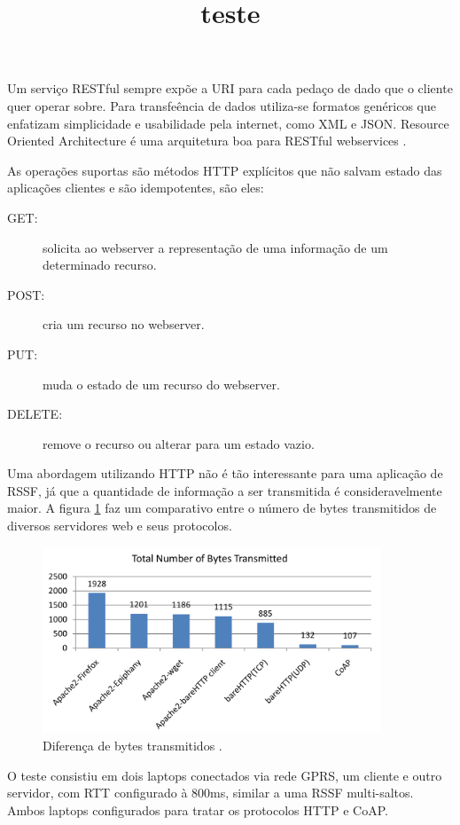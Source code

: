Um servi\c{c}o RESTful sempre exp\~oe a URI para cada peda\c{c}o de dado que o cliente quer operar sobre. Para transfe\^encia de dados utiliza-se formatos gen\'ericos que enfatizam simplicidade e usabilidade pela internet, como XML e JSON. Resource Oriented Architecture \'e uma arquitetura boa para RESTful webservices \cite{richardson2008restful}.

As opera\c{c}\~oes suportas s\~ao m\'etodos HTTP expl\'icitos que n\~ao salvam estado das aplica\c{c}\~oes clientes e s\~ao idempotentes, s\~ao eles:
\begin{description}
    \item[GET:] solicita ao webserver a representa\c{c}\~ao de uma informa\c{c}\~ao de um determinado recurso.
    \item[POST:] cria um recurso no webserver.
    \item[PUT:] muda o estado de um recurso do webserver.
    \item[DELETE:] remove o recurso ou alterar para um estado vazio.
\end{description}

Uma abordagem utilizando HTTP n\~ao \'e t\~ao interessante para uma aplica\c{c}\~ao de RSSF, j\'a que a quantidade de informa\c{c}\~ao a ser transmitida \'e consideravelmente maior. A figura \ref{bytesTransmitted} faz um comparativo entre o n\'umero de bytes transmitidos de diversos servidores web e seus protocolos.

\begin{figure}[H]
    \title{teste}
    \label{bytesTransmitted}
    \centering
    \includegraphics[width=0.9\textwidth]{figuras/bytestransmitted.png}
    \caption{Diferen\c{c}a de bytes transmitidos \cite{kuladinithi2011implementation}.}
\end{figure}

O teste consistiu em dois laptops conectados via rede GPRS, um cliente e outro servidor, com RTT configurado \`a 800ms, similar a uma RSSF multi-saltos. Ambos laptops configurados para tratar os protocolos HTTP e CoAP.

